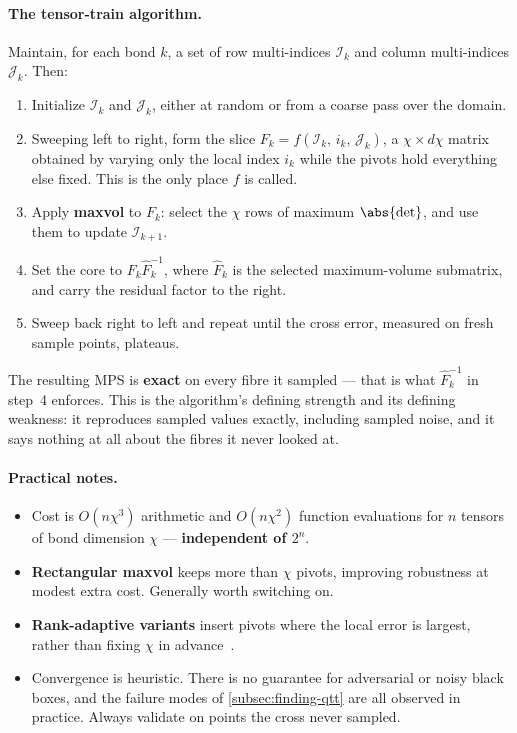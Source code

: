\paragraph{The tensor-train algorithm.}
Maintain, for each bond $k$, a set of row multi-indices $\mathcal{I}_k$ and
column multi-indices $\mathcal{J}_k$. Then:

\begin{enumerate}
  \item Initialize $\mathcal{I}_k$ and $\mathcal{J}_k$, either at random or from
    a coarse pass over the domain.
  \item Sweeping left to right, form the slice
    $F_k = f(\mathcal{I}_k,\, i_k,\, \mathcal{J}_k)$, a $\chi \times d\chi$
    matrix obtained by varying only the local index $i_k$ while the pivots hold
    everything else fixed. This is the only place $f$ is called.
  \item Apply \textbf{maxvol} to $F_k$: select the $\chi$ rows of maximum
    $\abs{\det}$, and use them to update $\mathcal{I}_{k+1}$.
  \item Set the core to $F_k \hat{F}_k^{-1}$, where $\hat{F}_k$ is the selected
    maximum-volume submatrix, and carry the residual factor to the right.
  \item Sweep back right to left and repeat until the cross error, measured on
    fresh sample points, plateaus.
\end{enumerate}

\begin{remark}
  The resulting MPS is \textbf{exact} on every fibre it sampled --- that is what
  $\hat{F}_k^{-1}$ in step~4 enforces. This is the algorithm's defining
  strength and its defining weakness: it reproduces sampled values exactly,
  including sampled noise, and it says nothing at all about the fibres it never
  looked at.
\end{remark}

\paragraph{Practical notes.}
\begin{itemize}
  \item Cost is $O(n \chi^3)$ arithmetic and $O(n \chi^2)$ function evaluations
    for $n$ tensors of bond dimension $\chi$ --- \textbf{independent of $2^n$}.
  \item \textbf{Rectangular maxvol} keeps more than $\chi$ pivots, improving
    robustness at modest extra cost. Generally worth switching on.
  \item \textbf{Rank-adaptive variants} insert pivots where the local error is
    largest, rather than fixing $\chi$ in advance~\cite{Nunez2025}.
  \item Convergence is heuristic. There is no guarantee for adversarial or noisy
    black boxes, and the failure modes of \cref{subsec:finding-qtt} are all
    observed in practice. Always validate on points the cross never sampled.
\end{itemize}


